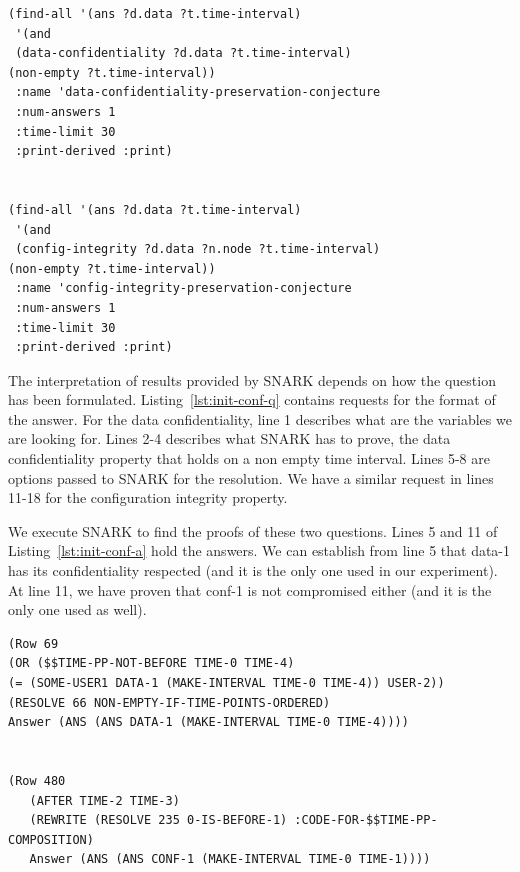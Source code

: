 \begin{lstlisting}[caption=SNARK question to validate the initial situation., label=lst:init-conf-q,captionpos=b] 
(find-all '(ans ?d.data ?t.time-interval)
 '(and
 (data-confidentiality ?d.data ?t.time-interval)
(non-empty ?t.time-interval))
 :name 'data-confidentiality-preservation-conjecture
 :num-answers 1
 :time-limit 30  
 :print-derived :print)


(find-all '(ans ?d.data ?t.time-interval)
 '(and
 (config-integrity ?d.data ?n.node ?t.time-interval)
(non-empty ?t.time-interval))
 :name 'config-integrity-preservation-conjecture
 :num-answers 1
 :time-limit 30  
 :print-derived :print)
\end{lstlisting}

The interpretation of results provided by SNARK depends on how the question has been formulated.
Listing~\ref{lst:init-conf-q} contains requests for the format of the answer.
For the data confidentiality, line 1 describes what are the variables we are looking for. Lines 2-4 describes what SNARK has to prove, \ie the data confidentiality property that holds on a non empty time interval.
Lines 5-8 are options passed to SNARK for the resolution.
We have a similar request in lines 11-18 for the configuration integrity property.

We execute SNARK to find the proofs of these two questions.
Lines 5 and 11 of Listing~\ref{lst:init-conf-a} hold the answers.
We can establish from line 5 that data-1 has its confidentiality respected (and it is the only one used in our experiment).
At line 11, we have proven that conf-1 is not compromised either (and it is the only one used as well).

\begin{lstlisting}[caption=SNARK validating the initial situation, label=lst:init-conf-a,captionpos=b] 
(Row 69
(OR ($$TIME-PP-NOT-BEFORE TIME-0 TIME-4) 
(= (SOME-USER1 DATA-1 (MAKE-INTERVAL TIME-0 TIME-4)) USER-2))
(RESOLVE 66 NON-EMPTY-IF-TIME-POINTS-ORDERED)
Answer (ANS (ANS DATA-1 (MAKE-INTERVAL TIME-0 TIME-4)))) 


(Row 480
   (AFTER TIME-2 TIME-3)
   (REWRITE (RESOLVE 235 0-IS-BEFORE-1) :CODE-FOR-$$TIME-PP-COMPOSITION)
   Answer (ANS (ANS CONF-1 (MAKE-INTERVAL TIME-0 TIME-1)))) 
\end{lstlisting}


